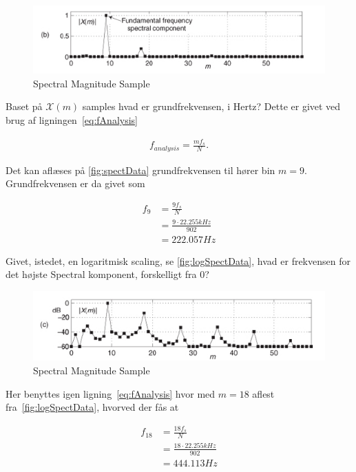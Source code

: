 \begin{figure}[h]
  \centering
  \includegraphics[width = \textwidth]{figures/SampleMag.png}
  \caption{Spectral Magnitude Sample}%
  \label{fig:spectData}
\end{figure}

Baset på $ \mathcal{X}(m) $ samples hvad er grundfrekvensen, i Hertz? 
Dette er givet ved brug af ligningen~\eqref{eq:fAnalysis}

\begin{align}
  \label{eq:fAnalysis}
  f_{analysis} = \frac{mf_{s}}{N}.
\end{align}

Det kan aflæses på \autoref{fig:spectData} grundfrekvensen til hører bin $ m = 9 $.
Grundfrekvensen er da givet som
  
\begin{align}
  f_{9} &= \frac{9 f_{s}}{N} \\
        &= \frac{9 \cdot 22.255 kHz}{902} \\
        &= 222.057 Hz
\end{align}

Givet, istedet, en logaritmisk scaling, se \autoref{fig:logSpectData}, hvad er frekvensen for det højste Spectral komponent, forskelligt fra $0$?

\begin{figure}[h]
  \centering
  \includegraphics[width = \textwidth]{figures/LogSampleMag.png}
  \caption{Spectral Magnitude Sample}%
  \label{fig:logSpectData}
\end{figure}

Her benyttes igen ligning~\eqref{eq:fAnalysis} hvor med $ m = 18 $ aflest fra~\autoref{fig:logSpectData}, hvorved der fås at

\begin{align}
  f_{18} &= \frac{18f_s}{N} \\
         &= \frac{18 \cdot 22.255 kHz}{902} \\
         &= 444.113 Hz
\end{align}

